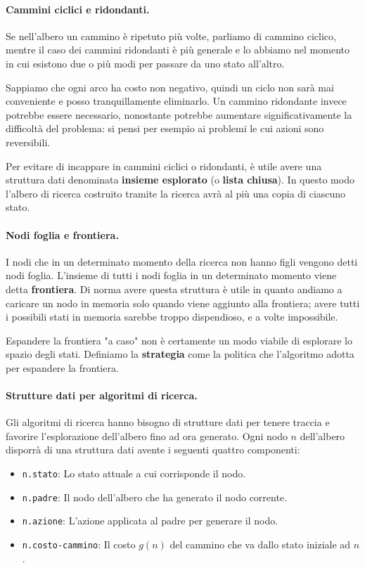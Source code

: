     \paragraph{Cammini ciclici e ridondanti.}
        Se nell'albero un cammino è ripetuto più volte, parliamo di cammino ciclico, mentre il caso dei cammini ridondanti è più generale e lo abbiamo nel momento in cui esistono due o più modi per passare da uno stato all'altro.
        
        Sappiamo che ogni arco ha costo non negativo, quindi un ciclo non sarà mai conveniente e posso tranquillamente eliminarlo. Un cammino ridondante invece potrebbe essere necessario, nonostante potrebbe aumentare significativamente la difficoltà del problema: si pensi per esempio ai problemi le cui azioni sono reversibili.
        
        Per evitare di incappare in cammini ciclici o ridondanti, è utile avere una struttura dati denominata \textbf{insieme esplorato} (o \textbf{lista chiusa}). In questo modo l'albero di ricerca costruito tramite la ricerca avrà al più una copia di ciascuno stato.
        
    \paragraph{Nodi foglia e frontiera.}
        I nodi che in un determinato momento della ricerca non hanno figli vengono detti nodi foglia. L'insieme di tutti i nodi foglia in un determinato momento viene detta \textbf{frontiera}. Di norma avere questa struttura è utile in quanto andiamo a caricare un nodo in memoria solo quando viene aggiunto alla frontiera; avere tutti i possibili stati in memoria sarebbe troppo dispendioso, e a volte impossibile.
        
        Espandere la frontiera "a caso" non è certamente un modo viabile di esplorare lo spazio degli stati. Definiamo la \textbf{strategia} come la politica che l'algoritmo adotta per espandere la frontiera.
        
    \paragraph{Strutture dati per algoritmi di ricerca.}
        Gli algoritmi di ricerca hanno bisogno di strutture dati per tenere traccia e favorire l'esplorazione dell'albero fino ad ora generato. Ogni nodo $n$ dell'albero disporrà di una struttura dati avente i seguenti quattro componenti:
        \begin{itemize}
            \item \texttt{n.stato}: Lo stato attuale a cui corrisponde il nodo.
            \item \texttt{n.padre}: Il nodo dell'albero che ha generato il nodo corrente.
            \item \texttt{n.azione}: L'azione applicata al padre per generare il nodo.
            \item \texttt{n.costo-cammino}: Il costo $g(n)$ del cammino che va dallo stato iniziale ad $n$.
        \end{itemize}
        
